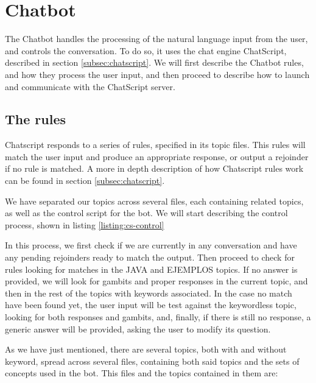 \section{Chatbot}
\label{sec:chatbot}

The Chatbot handles the processing of the natural language input from the user, and controls the conversation. To do so, it uses the chat engine ChatScript, described in section \ref{subsec:chatscript}. We will first describe the Chatbot rules, and how they process the user input, and then proceed to describe how to launch and communicate with the ChatScript server.

\subsection{The rules}

Chatscript responds to a series of rules, specified in its topic files. This rules will match the user input and produce an appropriate response, or output a rejoinder if no rule is matched. A more in depth description of how Chatscript rules work can be found in section \ref{subsec:chatscript}.

We have separated our topics across several files, each containing related topics, as well as the control script for the bot. We will start describing the control process, shown in listing \ref{listing:cs-control}

\begin{center}
  
\end{center}

In this process, we first check if we are currently in any conversation and have any pending rejoinders ready to match the output. Then proceed to check for rules looking for matches in the JAVA and EJEMPLOS topics. If no answer is provided, we will look for gambits and proper responses in the current topic, and then in the rest of the topics with keywords associated. In the case no match have been found yet, the user input will be test against the keywordless topic, looking for both responses and gambits, and, finally, if there is still no response, a generic answer will be provided, asking the user to modify its question.

As we have just mentioned, there are several topics, both with and without keyword, spread across several files, containing both said topics and the sets of concepts used in the bot. This files and the topics contained in them are:

